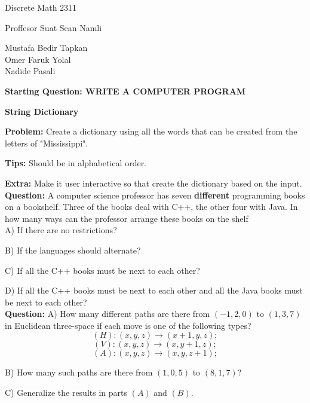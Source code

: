 \documentclass[11pt]{article}
\begin{document}
\begin{center}
Discrete Math 2311
\end{center}

\begin{center}
Proffesor Suat Sean Namli\\
\end{center}

\begin{center}
Mustafa Bedir Tapkan\\
Omer Faruk Yolal\\
Nadide Pasali\\
\end{center}

\newpage

\textbf{Starting Question: WRITE A COMPUTER PROGRAM} 

\textbf{String Dictionary}

\textbf{Problem:} Create a dictionary using all the words that can be created from the letters of "Mississippi". %

\textbf{Tips:} Should be in alphabetical order.

\textbf{Extra:} Make it user interactive so that create the dictionary based on the input.
\\

\textbf{Question:}  A computer science professor has seven \textbf{different} programming books on a bookshelf. Three of the books deal with C++, the other four with Java. In how many ways can the professor arrange these books on the shelf\\  %

A) If there are no restrictions?

B) If the languages should alternate?

C) If all the C++ books must be next to each other?

D) If all the C++ books must be next to each other and all the Java books must be next to each other?
\\

\textbf{Question:}  A) How many different paths are there from $(-1,2,0)$ to $(1,3,7)$ in Euclidean three-space if each move is one of the following types? %
$$(H):(x,y,z)\rightarrow(x+1,y,z);$$
$$(V):(x,y,z)\rightarrow(x,y+1,z);$$
$$(A):(x,y,z)\rightarrow(x,y,z+1);$$

B) How many such paths are there from $(1,0,5)$ to $(8,1,7)$?

C) Generalize the results in parts $(A)$ and $(B)$.
\\
\end{document}
